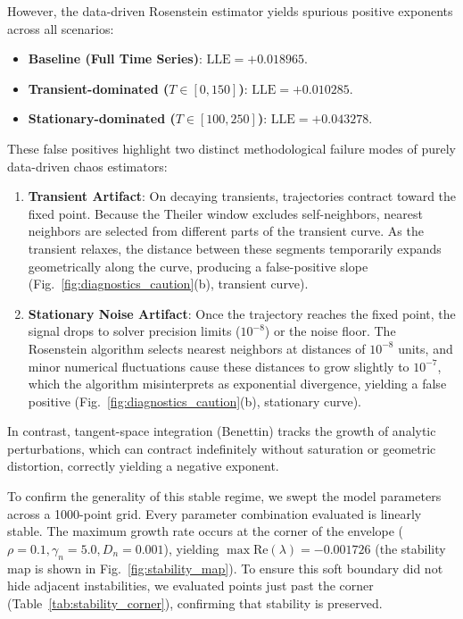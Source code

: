 \documentclass[review,3p,times]{elsarticle}
\begin{document}
However, the data-driven Rosenstein estimator yields spurious positive exponents across all scenarios:
\begin{itemize}
  \item \textbf{Baseline (Full Time Series)}: $\text{LLE} = +0.018965$.
  \item \textbf{Transient-dominated ($T \in [0, 150]$)}: $\text{LLE} = +0.010285$.
  \item \textbf{Stationary-dominated ($T \in [100, 250]$)}: $\text{LLE} = +0.043278$.
\end{itemize}

These false positives highlight two distinct methodological failure modes of purely data-driven chaos estimators:
\begin{enumerate}
  \item \textbf{Transient Artifact}: On decaying transients, trajectories contract toward the fixed point. Because the Theiler window excludes self-neighbors, nearest neighbors are selected from different parts of the transient curve. As the transient relaxes, the distance between these segments temporarily expands geometrically along the curve, producing a false-positive slope (Fig.~\ref{fig:diagnostics_caution}(b), transient curve).
  \item \textbf{Stationary Noise Artifact}: Once the trajectory reaches the fixed point, the signal drops to solver precision limits ($10^{-8}$) or the noise floor. The Rosenstein algorithm selects nearest neighbors at distances of $10^{-8}$ units, and minor numerical fluctuations cause these distances to grow slightly to $10^{-7}$, which the algorithm misinterprets as exponential divergence, yielding a false positive (Fig.~\ref{fig:diagnostics_caution}(b), stationary curve).
\end{enumerate}
In contrast, tangent-space integration (Benettin) tracks the growth of analytic perturbations, which can contract indefinitely without saturation or geometric distortion, correctly yielding a negative exponent.

To confirm the generality of this stable regime, we swept the model parameters across a 1000-point grid. Every parameter combination evaluated is linearly stable. The maximum growth rate occurs at the corner of the envelope ($\rho = 0.1, \gamma_n = 5.0, D_n = 0.001$), yielding $\max \text{Re}(\lambda) = -0.001726$ (the stability map is shown in Fig.~\ref{fig:stability_map}). To ensure this soft boundary did not hide adjacent instabilities, we evaluated points just past the corner (Table~\ref{tab:stability_corner}), confirming that stability is preserved.
\end{document}
